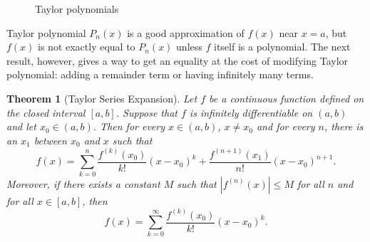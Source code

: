 \documentclass[12pt,letterpaper]{book}
\numberwithin{equation}{section}
\newtheorem{thm}{\textbf{Theorem}}[section]
\theoremstyle{definition}
\begin{document}
\begin{figure}[h]
\begin{center}
\end{center}
\caption{Taylor polynomials}
\label{taylor fig}
\end{figure}

Taylor polynomial $P_n(x)$ is a good approximation of $f(x)$ near $x=a$, but $f(x)$ is not exactly equal to $P_n(x)$ unless $f$ itself is a polynomial. The next result, however, gives a way to get an equality at the cost of modifying Taylor polynomial: adding a remainder term or having infinitely many terms.

\begin{thm}[Taylor Series Expansion]
Let $f$ be a continuous function defined on the closed interval $[a,b]$. Suppose that $f$ is infinitely differentiable on $(a,b)$ and let $x_0\in (a,b)$. Then for every $x\in (a,b)$, $x\neq x_0$ and for every $n$, there is an $x_1$ between $x_0$ and $x$ such that
\begin{equation}\label{with remainder} f(x)=\sum_{k=0}^{n}\frac{f^{(k)}(x_0)}{k!}(x-x_0)^k+\frac{f^{(n+1)}(x_1)}{n!}(x-x_0)^{n+1}. \end{equation}
Moreover, if there exists a constant $M$ such that $|f^{(n)}(x)|\leq M$ for all $n$ and for all $x\in [a,b]$, then
\begin{equation}\label{taylor series} f(x)=\sum_{k=0}^{\infty}\frac{f^{(k)}(x_0)}{k!}(x-x_0)^k. \end{equation}
\end{thm}
\end{document}
